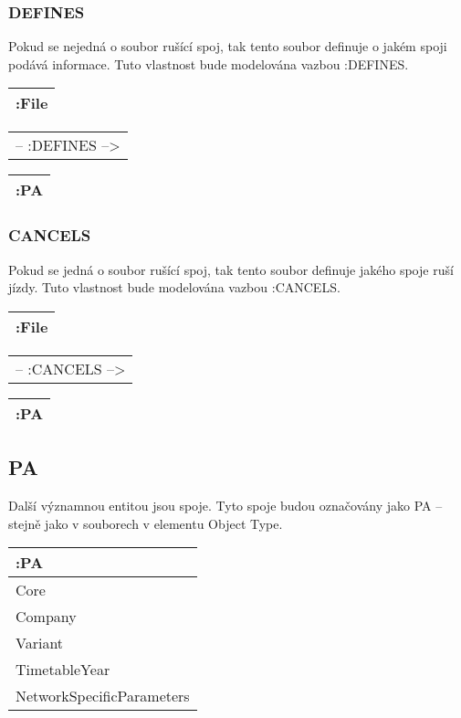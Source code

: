 \documentclass[10pt,xcolor=pdflatex,dvipsnames,table,oneside]{book}
\begin{document}
\subsubsection{DEFINES}
Pokud se nejedná o soubor rušící spoj, tak tento soubor definuje o jakém spoji podává informace. Tuto vlastnost bude modelována vazbou :DEFINES.

\vspace{1em}
\begin{tabular}{|l|}
    \hline
    :File \\
    \hline
\end{tabular}
\begin{tabular}{c}
    -- :DEFINES --> \\
\end{tabular}
\begin{tabular}{|l|}
    \hline
    :PA \\
    \hline
\end{tabular}

\subsubsection{CANCELS}
Pokud se jedná o soubor rušící spoj, tak tento soubor definuje jakého spoje ruší jízdy. Tuto vlastnost bude modelována vazbou :CANCELS.

\vspace{1em}
\begin{tabular}{|l|}
    \hline
    :File \\
    \hline
\end{tabular}
\begin{tabular}{c}
    -- :CANCELS --> \\
\end{tabular}
\begin{tabular}{|l|}
    \hline
    :PA \\
    \hline
\end{tabular}

\subsection{PA}
Další významnou entitou jsou spoje. Tyto spoje budou označovány jako PA -- stejně jako v souborech v elementu Object Type.

\vspace{1em}
\begin{tabular}{|l|}
    \hline
    :PA \\
    \hline
    Core \\
    Company \\
    Variant \\
    TimetableYear \\
    NetworkSpecificParameters \\
    \hline
\end{tabular}
\end{document}
